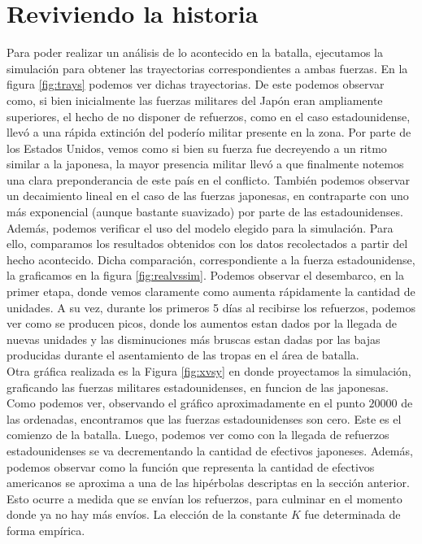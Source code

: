 \documentclass{sig-alternate}
\begin{document}
\section{Reviviendo la historia}
\label{sec:reviving}
Para poder realizar un análisis de lo acontecido en la batalla, ejecutamos la simulación para obtener las 
trayectorias correspondientes a ambas fuerzas. En la figura \ref{fig:trays} podemos ver dichas trayectorias. 
De este podemos observar como, si bien inicialmente las fuerzas militares del Japón eran ampliamente superiores, el hecho de no disponer de 
refuerzos, como en el caso estadounidense, llevó a una rápida extinción del poderío militar presente en la zona. Por parte de los 
Estados Unidos, vemos como si bien su fuerza fue decreyendo a un ritmo similar a la japonesa, la mayor presencia militar llevó a que finalmente
notemos una clara preponderancia de este país en el conflicto. También podemos observar un decaimiento lineal en el caso de las fuerzas japonesas,
en contraparte con uno más exponencial (aunque bastante suavizado) por parte de las estadounidenses.\\
Además, podemos verificar el uso del modelo elegido para la simulación. Para ello, comparamos los resultados obtenidos con los datos 
recolectados a partir del hecho acontecido. Dicha comparación, correspondiente a la fuerza estadounidense, la graficamos en la figura 
\ref{fig:realvssim}.
Podemos observar el desembarco, en la primer etapa, donde vemos claramente como aumenta rápidamente la cantidad de unidades. 
A su vez, durante los primeros 5 días al recibirse los refuerzos, podemos ver como se producen picos, 
donde los aumentos estan dados por la llegada de nuevas unidades y las disminuciones más bruscas estan dadas 
por las bajas producidas durante el asentamiento de las tropas en el área de batalla.\\
Otra gráfica realizada es la Figura \ref{fig:xvsy} en donde proyectamos la simulación, graficando las fuerzas militares
estadounidenses, en funcion de las japonesas. Como podemos ver, observando el gráfico aproximadamente en el punto $20000$ de las ordenadas,
encontramos que las fuerzas estadounidenses son cero. Este es el comienzo de la batalla. Luego, podemos ver como con la llegada de refuerzos 
estadounidenses se va decrementando la cantidad de efectivos japoneses. Además, podemos observar como la función que representa la cantidad de
efectivos americanos se aproxima a una de las hipérbolas descriptas en la sección anterior. Esto ocurre a medida que se envían los refuerzos,
para culminar en el momento donde ya no hay más envíos. La elección de la constante $K$ fue determinada de forma empírica.
\end{document}
